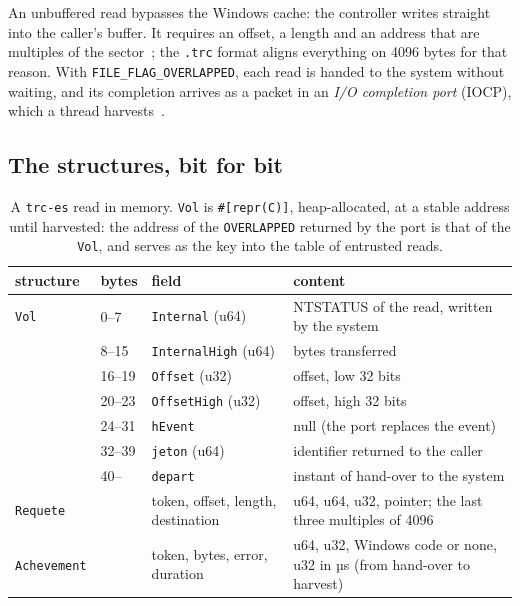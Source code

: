 An unbuffered read bypasses the Windows cache: the controller writes straight into the caller's buffer. It requires an offset, a length and an address that are multiples of the sector~\cite{microsoft2025filebuffering}; the \texttt{.trc} format aligns everything on \num{4096} bytes for that reason. With \texttt{FILE\_FLAG\_OVERLAPPED}, each read is handed to the system without waiting, and its completion arrives as a packet in an \emph{I/O completion port} (IOCP), which a thread harvests~\cite{microsoft2025iocp}.

\subsection{The structures, bit for bit}

\begin{table}[ht]
\centering\small
\caption[A \texttt{trc-es} read in memory]{A \texttt{trc-es} read in memory. \texttt{Vol} is \texttt{\#[repr(C)]}, heap-allocated, at a stable address until harvested: the address of the \texttt{OVERLAPPED} returned by the port is that of the \texttt{Vol}, and serves as the key into the table of entrusted reads.}
\label{tab:t2c-vol}
\begin{tabularx}{\linewidth}{@{}llp{3.2cm}X@{}}
\toprule
structure & bytes & field & content \\
\midrule
\texttt{Vol} & 0--7 & \texttt{Internal} (u64) & NTSTATUS of the read, written by the system \\
 & 8--15 & \texttt{InternalHigh} (u64) & bytes transferred \\
 & 16--19 & \texttt{Offset} (u32) & offset, low 32 bits \\
 & 20--23 & \texttt{OffsetHigh} (u32) & offset, high 32 bits \\
 & 24--31 & \texttt{hEvent} & null (the port replaces the event) \\
 & 32--39 & \texttt{jeton} (u64) & identifier returned to the caller \\
 & 40-- & \texttt{depart} & instant of hand-over to the system \\
\midrule
\texttt{Requete} & & token, offset, length, destination & u64, u64, u32, pointer; the last three multiples of \num{4096} \\
\texttt{Achevement} & & token, bytes, error, duration & u64, u32, Windows code or none, u32 in µs (from hand-over to harvest) \\
\bottomrule
\end{tabularx}
\end{table}

